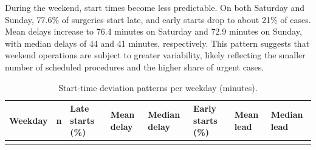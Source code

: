 \documentclass[
]{article}
\begin{document}
During the weekend, start times become less predictable. On both
Saturday and Sunday, 77.6\% of surgeries start late, and early starts
drop to about 21\% of cases. Mean delays increase to 76.4 minutes on
Saturday and 72.9 minutes on Sunday, with median delays of 44 and 41
minutes, respectively. This pattern suggests that weekend operations are
subject to greater variability, likely reflecting the smaller number of
scheduled procedures and the higher share of urgent cases.

\begin{longtable}[]{@{}
  >{\centering\arraybackslash}p{}
  >{\centering\arraybackslash}p{}
  >{\centering\arraybackslash}p{}
  >{\centering\arraybackslash}p{}
  >{\centering\arraybackslash}p{}
  >{\centering\arraybackslash}p{}
  >{\centering\arraybackslash}p{}
  >{\centering\arraybackslash}p{}@{}}
\caption{Start-time deviation patterns per weekday (minutes).
\label{tab:start_diff_weekday}}\tabularnewline
\toprule\noalign{}
\begin{minipage}[b]{\linewidth}\centering
Weekday
\end{minipage} & \begin{minipage}[b]{\linewidth}\centering
n
\end{minipage} & \begin{minipage}[b]{\linewidth}\centering
Late starts (\%)
\end{minipage} & \begin{minipage}[b]{\linewidth}\centering
Mean delay
\end{minipage} & \begin{minipage}[b]{\linewidth}\centering
Median delay
\end{minipage} & \begin{minipage}[b]{\linewidth}\centering
Early starts (\%)
\end{minipage} & \begin{minipage}[b]{\linewidth}\centering
Mean lead
\end{minipage} & \begin{minipage}[b]{\linewidth}\centering
Median lead
\end{minipage} \\
\midrule\noalign{}
\endfirsthead

\end{longtable}
\end{document}
